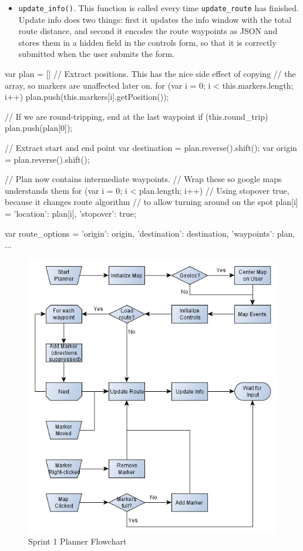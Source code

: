 \begin{itemize}
	\item{\texttt{update\_info()}. This function is called every time \texttt{update\_route} has finished. Update info does two things: first it updates the info window with the total route distance, and second it encodes the route waypoints as \ac{JSON} and stores them in a hidden field in the controls form, so that it is correctly submitted when the user submits the form.}
\end{itemize}

\begin{code}[label={lst:update-route-1}, caption={Converting a List of Waypoints for Directions}, language={JavaScript}]
var plan = []
// Extract positions. This has the nice side effect of copying  
// the array, so markers are unaffected later on.
for (var i = 0; i < this.markers.length; i++)
{
	plan.push(this.markers[i].getPosition());
}

// If we are round-tripping, end at the last waypoint
if (this.round_trip)
	plan.push(plan[0]);

// Extract start and end point
var destination = plan.reverse().shift();
var origin = plan.reverse().shift();

// Plan now contains intermediate waypoints. 
// Wrap these so google maps understands them
for (var i = 0; i < plan.length; i++)
{
	// Using stopover true, because it changes route algorithm 
	// to allow turning around on the spot
	plan[i] = {'location': plan[i], 'stopover': true};
}
		
var route_options = {'origin': origin,
					 'destination': destination,
					 'waypoints': plan,
					 ...}
\end{code}

\begin{figure}[!ht]
	\centering
	\includegraphics[width=\textwidth]{img/sprint1webflow.png}
	\caption{Sprint 1 Planner Flowchart}
	\label{fig:sprint1-web-flow}
\end{figure}

